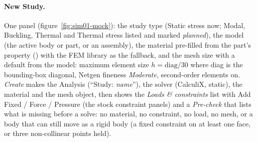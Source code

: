 \paragraph{New Study.} One panel (figure~\ref{fig:sim01-mock}): the study type (Static stress now; Modal,
Buckling, Thermal and Thermal stress listed and marked \emph{planned}), the model (the active body or part, or an
assembly), the material pre-filled from the part's  property () with the FEM library as
the fallback, and the mesh size with a default from the model: maximum element size $h=\text{diag}/30$ where diag
is the bounding-box diagonal, Netgen fineness \emph{Moderate}, second-order elements on. \emph{Create} makes the
Analysis (``Study: \emph{name}''), the solver (CalculiX, static), the material and the mesh object, then shows
the \emph{Loads \& constraints} list with Add Fixed / Force / Pressure (the stock constraint panels) and a
\emph{Pre-check} that lists what is missing before a solve: no material, no constraint, no load, no mesh, or
a body that can still move as a rigid body (a fixed constraint on at least one face, or three non-collinear
points held).

